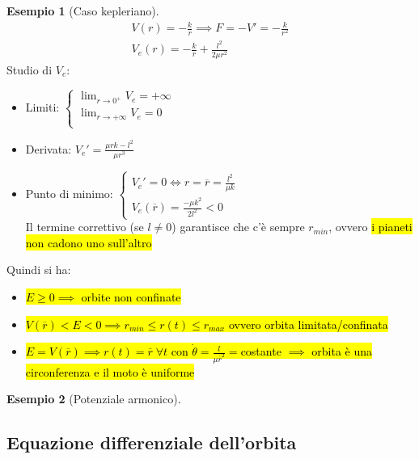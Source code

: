 \documentclass[a4paper,10pt]{article}
\theoremstyle{definition}
\theoremstyle{indentdefinition}
\theoremstyle{indenttheorem}
\theoremstyle{myremark}
\newtheorem{example*}{Esempio}
\theoremstyle{indentgeneral}
\begin{document}
\begin{example*}[Caso kepleriano]
\begin{align*}
    V(r)=-\frac{k}{r}  \implies  F=-V'=-\frac{k}{r^2} \\
    V_{e}\left(r\right)=-\frac{k}{r}+\frac{l^{2}}{2\mu r^{2}}
\end{align*}
Studio di $V_e$:
\begin{itemize}
    \item Limiti: $\begin{cases}
        \lim_{r\to 0^+}V_e=+\infty \\
        \lim_{r\to +\infty}V_e=0 \\
    \end{cases}$
    \item Derivata: $V_e'=\frac{\mu rk-l^2}{\mu r^3}$
    \item Punto di minimo: $\begin{cases}
        V_e'=0\iff r=\overline{r}=\frac{l^2}{\mu k} \\
        V_e(\overline{r})=\frac{-\mu k^2}{2l^2}<0
    \end{cases}$ \\
    Il termine correttivo (se $l\ne 0$) garantisce che c'è sempre $r_{min}$, ovvero \hl{i pianeti non cadono uno sull'altro}
\end{itemize}
Quindi si ha:
\begin{itemize}
    \item \hl{$E\ge0\implies$ orbite non confinate}
    \item \hl{$V(\overline{r})<E<0\implies r_{min}\le r(t)\le r_{max}$ ovvero orbita limitata/confinata}
    \item \hl{$E=V(\overline{r})\implies r(t)=\overline{r}\;\forall t$ con $\dot{\theta}=\frac{l}{\mu\overline{r}^2}=$costante $\implies$ orbita è una circonferenza e il moto è uniforme}
\end{itemize}
    
\end{example*}

\begin{example*}[Potenziale armonico]
    
\end{example*}

\subsection{Equazione differenziale dell'orbita}
\end{document}
